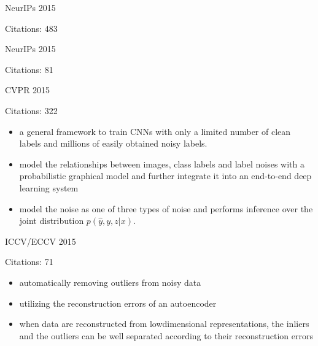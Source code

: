 \documentclass[11pt]{article}
\begin{document}
\vspace{2cm}

\noindent NeurIPs 2015

\noindent Citations: 483

\vspace{2cm}

\noindent NeurIPs 2015

\noindent Citations: 81

\vspace{2cm}

\noindent CVPR 2015

\noindent Citations: 322

\begin{itemize}
\item a general framework to train CNNs with only a limited number of clean labels and millions of easily obtained noisy labels.
\item  model the relationships between images, class labels and label noises with a probabilistic graphical model and further integrate it into an end-to-end deep learning system
\item model the noise as one of three types of noise and performs inference over the joint distribution $p(\hat{y},y,z | x)$.
\end{itemize}

\vspace{2cm}

\noindent ICCV/ECCV 2015

\noindent Citations: 71

\begin{itemize}
\item automatically removing outliers from noisy data
\item utilizing the reconstruction errors of an autoencoder
\item when data are reconstructed from lowdimensional representations, the inliers and the outliers can be well separated according to their reconstruction errors
\end{itemize}

\vspace{2cm}
\end{document}
